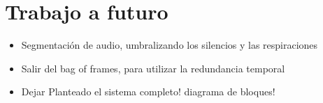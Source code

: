 \documentclass{article}
\begin{document}
\subsubsection{}


\section{Trabajo a futuro}

\begin{itemize} 
  \item Segmentación de audio, umbralizando los silencios y las respiraciones 
  \item Salir del bag of frames, para utilizar la redundancia temporal
  \item Dejar Planteado el sistema completo! diagrama de bloques!
\end{itemize}


\newpage




\end{document}

